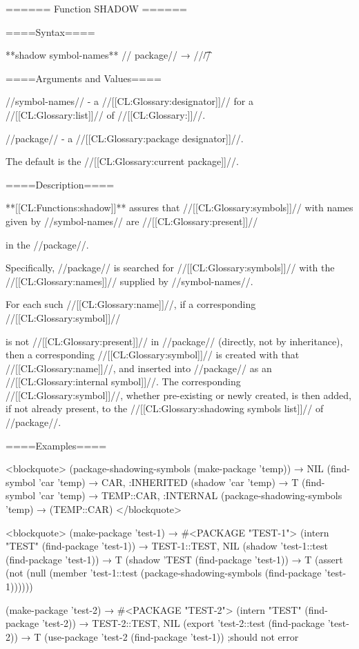====== Function SHADOW ======

====Syntax====

**shadow {symbol-names** //\opt} package// → //\t//

====Arguments and Values====

//symbol-names// - a //[[CL:Glossary:designator]]// for a //[[CL:Glossary:list]]// of //[[CL:Glossary:\symbolnamedesignators]]//.

//package// - a //[[CL:Glossary:package designator]]//.

The default is the //[[CL:Glossary:current package]]//.

====Description====

**[[CL:Functions:shadow]]** assures that //[[CL:Glossary:symbols]]// with names given by //symbol-names// are //[[CL:Glossary:present]]//

in the //package//.

Specifically, //package// is searched for //[[CL:Glossary:symbols]]// with the //[[CL:Glossary:names]]// supplied by //symbol-names//.

For each such //[[CL:Glossary:name]]//, if a corresponding //[[CL:Glossary:symbol]]//

is not //[[CL:Glossary:present]]// in //package// (directly, not by inheritance), then a corresponding //[[CL:Glossary:symbol]]// is created with that //[[CL:Glossary:name]]//, and inserted into //package// as an //[[CL:Glossary:internal symbol]]//. The corresponding //[[CL:Glossary:symbol]]//, whether pre-existing or newly created, is then added, if not already present, to the //[[CL:Glossary:shadowing symbols list]]// of //package//.


====Examples====

<blockquote> (package-shadowing-symbols (make-package 'temp)) → NIL (find-symbol 'car 'temp) → CAR, :INHERITED (shadow 'car 'temp) → T (find-symbol 'car 'temp) → TEMP::CAR, :INTERNAL (package-shadowing-symbols 'temp) → (TEMP::CAR) </blockquote>

<blockquote> (make-package 'test-1) → #<PACKAGE "TEST-1"> (intern "TEST" (find-package 'test-1)) → TEST-1::TEST, NIL (shadow 'test-1::test (find-package 'test-1)) → T (shadow 'TEST (find-package 'test-1)) → T (assert (not (null (member 'test-1::test (package-shadowing-symbols (find-package 'test-1))))))

(make-package 'test-2) → #<PACKAGE "TEST-2"> (intern "TEST" (find-package 'test-2)) → TEST-2::TEST, NIL (export 'test-2::test (find-package 'test-2)) → T (use-package 'test-2 (find-package 'test-1)) ;should not error

